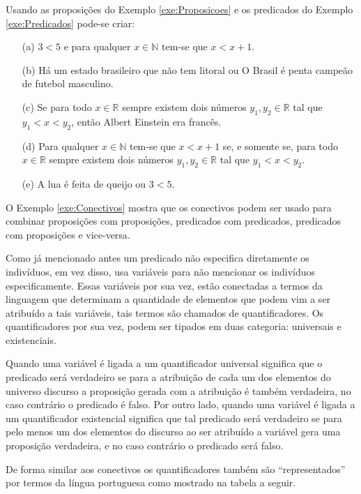 \begin{exem}\label{exe:Conectivos}
	Usando as proposições do Exemplo \ref{exe:Proposicoes} e os predicados do Exemplo \ref{exe:Predicados} pode-se criar:
	\begin{itemize}
		\item[(a)] $3 < 5$ e para qualquer $x \in\mathbb{N}$ tem-se que $x < x + 1$.
		\item[(b)] Há um estado brasileiro que não tem litoral ou O Brasil é penta campeão de futebol masculino.
		\item[(c)] Se para todo $x \in \mathbb{R}$ sempre existem dois números $y_1, y_2 \in \mathbb{R}$ tal que $y_1 < x < y_2$, então Albert Einstein era francês.
		\item[(d)] Para qualquer $x \in\mathbb{N}$ tem-se que $x < x + 1$ se, e somente se, para todo $x \in \mathbb{R}$ sempre existem dois números $y_1, y_2 \in \mathbb{R}$ tal que $y_1 < x < y_2$.
		\item[(e)] A lua é feita de queijo ou $3 < 5$.
	\end{itemize}
\end{exem}

\begin{rema}
	O Exemplo \ref{exe:Conectivos} mostra que os conectivos podem ser usado para combinar proposições com proposições, predicados com predicados, predicados com proposições e vice-versa.
\end{rema}

Como já mencionado antes um predicado não especifica diretamente os indivíduos, em vez disso, usa variáveis para não mencionar os indivíduos especificamente. Essas variáveis por sua vez, estão conectadas a termos da linguagem que determinam a quantidade de elementos que podem vim a ser atribuído a tais variáveis, tais termos são chamados de quantificadores. Os quantificadores por sua vez, podem ser tipados em duas categoria: universais e existenciais. 

Quando uma variável é ligada a um quantificador universal significa que o predicado será verdadeiro se para a atribuição de cada um  dos elementos do universo discurso a proposição gerada com a atribuição é também verdadeira, no caso contrário o predicado é falso. Por outro lado, quando uma variável é ligada a um quantificador existencial significa que tal predicado será verdadeiro se para pelo menos um dos elementos do discurso ao ser atribuído a variável gera uma proposição verdadeira, e no caso contrário o predicado será falso.

De forma similar aos conectivos os quantificadores também são ``representados'' por termos da língua portuguesa como mostrado na tabela a seguir.


